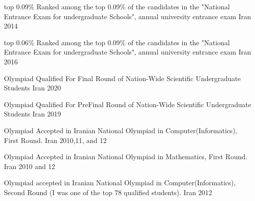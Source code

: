 \begin{cvhonors}
  \cvhonor
    {top 0.09\%} %
    {Ranked among the top 0.09\% of the candidates in the "National Entrance Exam for undergraduate Schools", annual university entrance exam} %
    {Iran} %
    {2014} %
    
  \cvhonor
    {top 0.06\%} %
    {Ranked among the top 0.09\% of the candidates in the "National Entrance Exam for undergraduate Schools", annual university entrance exam} %
    {Iran} %
    {2016} %
    
  \cvhonor
    {Olympiad} %
    {Qualified For Final Round of Nation-Wide Scientific Undergraduate Students} %
    {Iran} %
    {2020} %

  \cvhonor
    {Olympiad} %
    {Qualified For Pre\-Final Round of Nation-Wide Scientific Undergraduate Students} %
    {Iran} %
    {2019} %
    
  \cvhonor
    {Olympiad} %
    {Accepted in Iranian National Olympiad in Computer(Informatics), First Round.} %
    {Iran} %
    {2010,11, and 12} %

  \cvhonor
    {Olympiad} %
    {Accepted in Iranian National Olympiad in Mathematics, First Round.} %
    {Iran} %
    {2010 and 12} %
    
  \cvhonor
    {Olympiad} %
    {accepted in Iranian National Olympiad in Computer(Informatics), Second Round (I was one of the top 78 qualified students).} %
    {Iran} %
    {2012} %

  
\end{cvhonors}